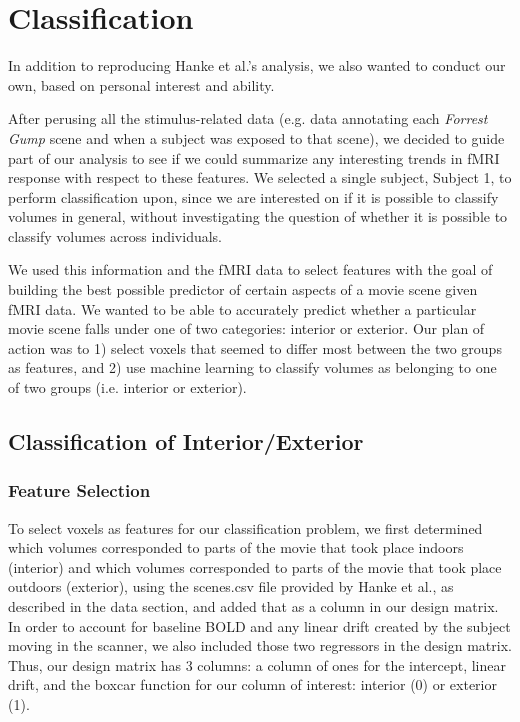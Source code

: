 \documentclass[11pt]{article}
\begin{document}
\section{Classification}

In addition to reproducing Hanke et al.'s analysis, we also wanted to
conduct our own, based on personal interest and ability.

After perusing all the stimulus-related data (e.g. data annotating each 
\emph{Forrest Gump} scene and when a subject was exposed to that scene), we 
decided to guide part of our analysis to see if we could
summarize any interesting trends in fMRI response with respect to these
features. We selected a single subject, Subject 1, to perform classification
upon, since we are interested on if it is possible to classify volumes in
general, without investigating the question of whether it is possible to 
classify volumes across individuals.

We used this information and the fMRI data to select features with the goal of
building the best possible predictor of certain aspects of a movie scene given
fMRI data. We wanted to be able to accurately predict whether a particular
movie scene falls under one of two categories: interior or 
exterior.  Our plan of action was to 1) select voxels that seemed to differ most 
between the two groups as features, and 2) use machine learning to classify 
volumes as belonging to one of two groups (i.e. interior or exterior).

\subsection{Classification of Interior/Exterior}

\subsubsection{Feature Selection}

To select voxels as features for our classification problem, we first
determined which volumes corresponded to parts of the movie that took place 
indoors (interior) and which volumes corresponded to parts of the movie that took place 
outdoors (exterior), using the scenes.csv file provided by Hanke et al., as 
described in the data section, and added that as a column in our design matrix. 
In order to account for baseline BOLD and any linear drift created by the subject 
moving in the scanner, we also included those two regressors in the design matrix.
Thus, our design matrix has 3 columns: a column of 
ones for the intercept, linear drift, and the boxcar function for our column of interest: interior (0) or exterior (1).
\end{document}
